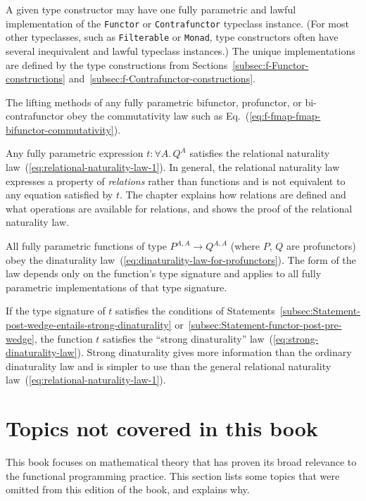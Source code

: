 A given type constructor may have one fully parametric and lawful
implementation of the \lstinline!Functor! or \lstinline!Contrafunctor!
typeclass instance. (For most other typeclasses, such as \lstinline!Filterable!
or \lstinline!Monad!, type constructors often have several inequivalent
and lawful typeclass instances.) The unique implementations are defined
by the type constructions from Sections~\ref{subsec:f-Functor-constructions}
and~\ref{subsec:f-Contrafunctor-constructions}.

The lifting methods of any fully parametric bifunctor, profunctor,
or bi-contrafunctor obey the commutativity law such as Eq.~(\ref{eq:f-fmap-fmap-bifunctor-commutativity}). 

Any fully parametric expression $t:\forall A.\,Q^{A}$ satisfies the
relational naturality law~(\ref{eq:relational-naturality-law-1}).
In general, the relational naturality law expresses a property of
\emph{relations} rather than functions and is not equivalent to any
equation satisfied by $t$. The chapter explains how relations are
defined and what operations are available for relations, and shows
the proof of the relational naturality law.

All fully parametric functions of type $P^{A,A}\rightarrow Q^{A,A}$
(where $P$, $Q$ are profunctors) obey the dinaturality law~(\ref{eq:dinaturality-law-for-profunctors}).
The form of the law depends only on the function\textsf{'}s type signature
and applies to all fully parametric implementations of that type signature.

If the type signature of $t$ satisfies the conditions of Statements~\ref{subsec:Statement-post-wedge-entails-strong-dinaturality}
or~\ref{subsec:Statement-functor-post-pre-wedge}, the function $t$
satisfies the \textsf{``}strong dinaturality\textsf{''} law~(\ref{eq:strong-dinaturality-law}).
Strong dinaturality gives more information than the ordinary dinaturality
law and is simpler to use than the general relational naturality law~(\ref{eq:relational-naturality-law-1}).

\setcounter{secnumdepth}{3}%
\begin{comment}
Restore the normal numbering of subsections and subsubsections
\end{comment}


\section{Topics not covered in this book}

This book focuses on mathematical theory that has proven its broad
relevance to the functional programming practice. This section lists
some topics that were omitted from this edition of the book, and explains
why.

